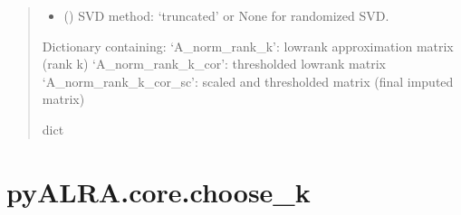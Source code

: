 \documentclass[letterpaper,10pt,english]{sphinxmanual}
\begin{document}
\begin{fulllineitems}
\begin{quote}
\begin{description}
\begin{itemize}
\item {} 
\sphinxAtStartPar
{} (\sphinxstyleliteralemphasis{\sphinxupquote{, }}) \textendash{} SVD method: ‘truncated’ or None for randomized SVD.

\end{itemize}

\sphinxAtStartPar
Dictionary containing:
\sphinxhyphen{} ‘A\_norm\_rank\_k’: low\sphinxhyphen{}rank approximation matrix (rank k)
\sphinxhyphen{} ‘A\_norm\_rank\_k\_cor’: thresholded low\sphinxhyphen{}rank matrix
\sphinxhyphen{} ‘A\_norm\_rank\_k\_cor\_sc’: scaled and thresholded matrix (final imputed matrix)

\sphinxAtStartPar
dict

\end{description}\end{quote}

\end{fulllineitems}



\section{pyALRA.core.choose\_k}
\label{\detokenize{core:pyalra-core-choose-k}}
\end{document}
